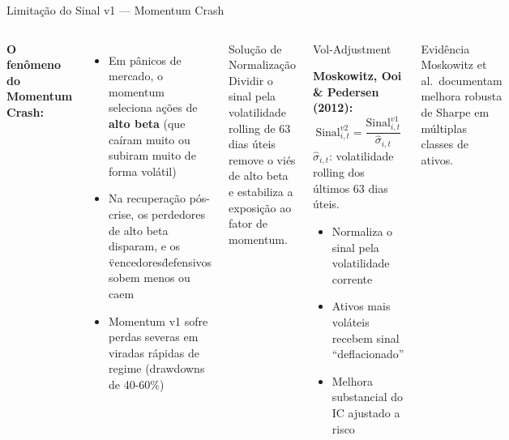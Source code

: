 \documentclass[aspectratio=169,12pt]{beamer}
\begin{document}
\begin{frame}[fragile]{Limitação do Sinal v1 — Momentum Crash}
\begin{columns}[T]
\textbf{O fenômeno do Momentum Crash:}
\vspace{.3em}
\begin{itemize}
  \item Em pânicos de mercado, o momentum seleciona ações de \textbf{alto beta} (que caíram muito ou subiram muito de forma volátil)
  \item Na recuperação pós-crise, os perdedores de alto beta disparam, e os \"vencedores\" defensivos sobem menos ou caem
  \item Momentum v1 sofre perdas severas em viradas rápidas de regime (drawdowns de 40-60\%)
\end{itemize}
\vspace{.3em}
\begin{alertblock}{Solução de Normalização}
  Dividir o sinal pela volatilidade rolling de 63 dias úteis remove o viés de alto beta e estabiliza a exposição ao fator de momentum.
\end{alertblock}
\begin{block}{Vol-Adjustment}

\textbf{Moskowitz, Ooi \& Pedersen (2012):}
\[
\text{Sinal}^{v2}_{i,t} = \frac{\text{Sinal}^{v1}_{i,t}}{\hat\sigma_{i,t}}
\]
$\hat\sigma_{i,t}$: volatilidade rolling dos últimos 63 dias úteis.
\vspace{.3em}
\begin{itemize}
  \item Normaliza o sinal pela volatilidade corrente
  \item Ativos mais voláteis recebem sinal ``deflacionado''
  \item Melhora substancial do IC ajustado a risco
\end{itemize}
\end{block}\vspace{.3em}
\begin{exampleblock}{Evidência}
Moskowitz et al.\ documentam melhora robusta de Sharpe em múltiplas classes de ativos.
\end{exampleblock}
\end{columns}
\end{frame}
\end{document}
